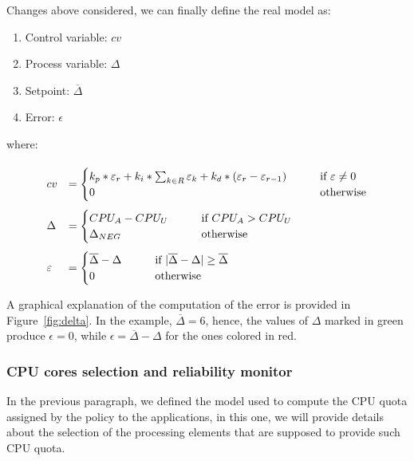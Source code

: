 Changes above considered, we can finally define the real model as:
\begin{enumerate}[label=-]
    \item Control variable: $cv$
    \item Process variable: $\Delta$
    \item Setpoint: $\overline{\Delta}$
    \item Error: $\epsilon$
\end{enumerate}
where:
\begin{align*}
    \renewcommand{\arraystretch}{3}
    \begin{array}{ll}
        cv &= 
        \begin{cases}
                k_{p}*\epsilon_r + k_{i}*\sum_{k\in R}\epsilon_{k} + k_d*(\epsilon_{r}-\epsilon_{r-1}) & \qquad \mbox{if } \epsilon\neq 0 \\
        	    0 & \qquad\mbox{otherwise} 
        \end{cases}\\
        \Delta &= 
            \begin{cases}
        	    CPU_{A} - CPU_{U} \hfill& \qquad \mbox{if } CPU_{A} > CPU_{U} \\
        	    \Delta_{NEG} &\qquad \text{otherwise}
    	    \end{cases}\\
    	    \epsilon &=
    	    \begin{cases}
        	    \overline{\Delta} - \Delta &\qquad\mbox{if } |\overline{\Delta}-\Delta| \geq \overline{\Delta}\mbox{}\\
        	    0 &\qquad \mbox{otherwise}
    	    \end{cases}
	\end{array}
\end{align*}


A graphical explanation of the computation of the error is provided in Figure~\ref{fig:delta}. In the example, $\overline{\Delta}=6$, hence, the values of $\Delta$ marked in green produce $\epsilon=0$, while $\epsilon=\overline{\Delta}-\Delta$ for the ones colored in red.

\subsubsection{CPU cores selection and reliability monitor}
\label{sec:corsel}
In the previous paragraph, we defined the model used to compute the CPU quota assigned by the policy to the applications, in this one, we will provide details about the selection of the processing elements that are supposed to provide such CPU quota.

